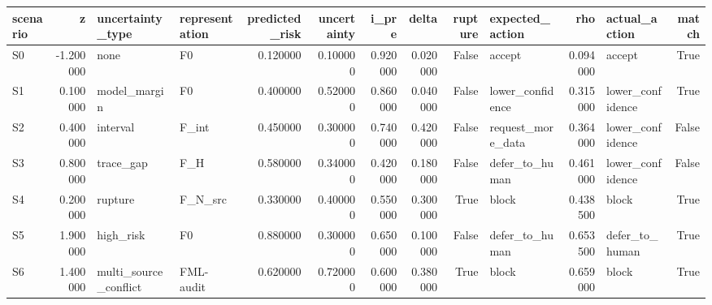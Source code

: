 \begin{tabular}{lrllrrrrrlrlr}
\toprule
scenario & z & uncertainty\_type & representation & predicted\_risk & uncertainty & i\_pre & delta & rupture & expected\_action & rho & actual\_action & match \\
\midrule
S0 & -1.200000 & none & F0 & 0.120000 & 0.100000 & 0.920000 & 0.020000 & False & accept & 0.094000 & accept & True \\
S1 & 0.100000 & model\_margin & F0 & 0.400000 & 0.520000 & 0.860000 & 0.040000 & False & lower\_confidence & 0.315000 & lower\_confidence & True \\
S2 & 0.400000 & interval & F\_int & 0.450000 & 0.300000 & 0.740000 & 0.420000 & False & request\_more\_data & 0.364000 & lower\_confidence & False \\
S3 & 0.800000 & trace\_gap & F\_H & 0.580000 & 0.340000 & 0.420000 & 0.180000 & False & defer\_to\_human & 0.461000 & lower\_confidence & False \\
S4 & 0.200000 & rupture & F\_N\_src & 0.330000 & 0.400000 & 0.550000 & 0.300000 & True & block & 0.438500 & block & True \\
S5 & 1.900000 & high\_risk & F0 & 0.880000 & 0.300000 & 0.650000 & 0.100000 & False & defer\_to\_human & 0.653500 & defer\_to\_human & True \\
S6 & 1.400000 & multi\_source\_conflict & FML-audit & 0.620000 & 0.720000 & 0.600000 & 0.380000 & True & block & 0.659000 & block & True \\
\bottomrule
\end{tabular}
